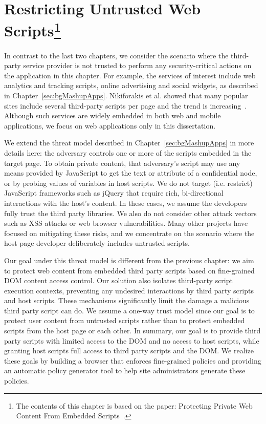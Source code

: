 \chapter[Restricting Untrusted Web Scripts] {Restricting Untrusted Web Scripts\footnote{The contents of this chapter is based on the paper: Protecting Private Web Content From Embedded Scripts~\cite{Zhou-ESORICS}.}}
\label{sec:esorics}

In contrast to the last two chapters, we consider the scenario where the third-party service provider is not trusted to perform any security-critical actions on the application in this chapter.  For example, the services of interest include web analytics and tracking scripts, online advertising and social widgets, as described in Chapter~\ref{sec:bgMashupApps}.  Nikiforakis et al. showed that many popular sites include several third-party scripts per page and the trend is increasing~\cite{Nikiforakis:2012:YYI:2382196.2382274}.  Although such services are widely embedded in both web and mobile applications, we focus on web applications only in this dissertation.  

  We extend the threat model described in Chapter~\ref{sec:bgMashupApps} in more details here: the adversary controls one or more of the scripts embedded in the target page.  To obtain private content, that adversary's script may use any means provided by JavaScript to get the text or attribute of a confidential node, or by probing values of variables in host scripts.  We do not target (i.e. restrict) JavaScript frameworks such as jQuery that require rich, bi-direct\-ion\-al interactions with the host's content.  In these cases, we assume the developers fully trust the third party libraries.  We also do not consider other attack vectors such as XSS attacks or web browser vulnerabilities.  Many other projects have focused on mitigating these risks, and we concentrate on the scenario where the host page developer deliberately includes untrusted scripts.

Our goal under this threat model is different from the previous chapter: we aim to protect web content from embedded third party scripts based on fine-grained DOM content access control.  Our solution also isolates third-party script execution contexts, preventing any undesired interactions by third party scripts and host scripts.  These mechanisms significantly limit the damage a malicious third party script can do.  We assume a one-way trust model since our goal is to protect user content from untrusted scripts rather than to protect embedded scripts from the host page or each other.  In summary, our goal is to provide third party scripts with limited access to the DOM and no access to host scripts, while granting host scripts full access to third party scripts and the DOM.  We realize these goals by building a browser that enforces fine-grained policies and providing an automatic policy generator tool to help site administrators generate these policies.  

